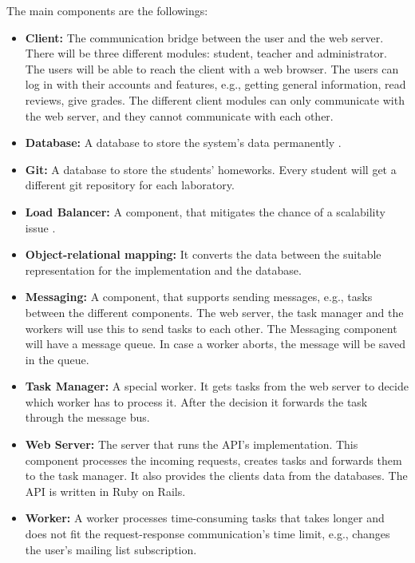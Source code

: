 The main components are the followings:

\begin{itemize}
	\item \textbf{Client:} The communication bridge between the user and the web server. There will be three different modules: student, teacher and administrator. The users will be able to reach the client with a web browser. The users can log in with their accounts and features, e.g., getting general information, read reviews, give grades. The different client modules can only communicate with the web server, and they cannot communicate with each other. 
	\item \textbf{Database:} A database to store the system's data permanently . 
	\item \textbf{Git:} A database to store the students' homeworks. Every student will get a different git repository for each laboratory.
	\item \textbf{Load Balancer:} A component, that mitigates the chance of a scalability issue . 
	\item \textbf{Object-relational mapping:} It converts the data between the suitable representation for the implementation and the database. 
	\item \textbf{Messaging:} A component, that supports sending messages, e.g., tasks between the different components. The web server, the task manager and the workers will use this to send tasks to each other. The Messaging component will have a message queue. In case a worker aborts, the message will be saved in the queue.
	\item \textbf{Task Manager:} A special worker. It gets tasks from the web server to decide which worker has to process it. After the decision it forwards the task through the message bus.
	\item \textbf{Web Server:} The server that runs the API's implementation. This component processes the incoming requests, creates tasks and forwards them to the task manager. It also provides the clients data from the databases. The API is written in Ruby on Rails. 
	\item \textbf{Worker:} A worker processes time-consuming tasks that takes longer and does not fit the request-response communication's time limit, e.g., changes the user's mailing list subscription.
\end{itemize}

